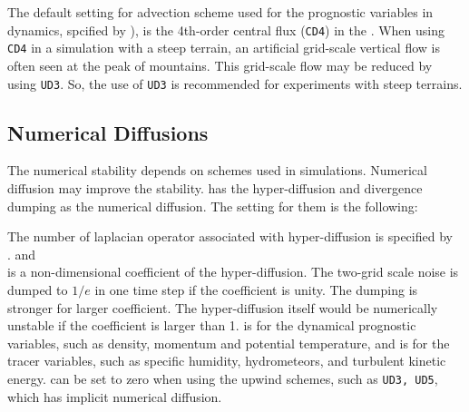 The default setting for advection scheme used for the prognostic variables in dynamics, spcified by ),
is the 4th-order central flux (\verb|CD4|) in the \scalerm.
When using \verb|CD4| in a simulation with a steep terrain,
an artificial grid-scale vertical flow is often seen at the peak of mountains.
This grid-scale flow may be reduced by using \verb|UD3|.
So, the use of \verb|UD3| is recommended for experiments with steep terrains.


\subsection{Numerical Diffusions}

The numerical stability depends on schemes used in simulations.
Numerical diffusion may improve the stability.
\scalerm has the hyper-diffusion and divergence dumping as the numerical diffusion.
The setting for them is the following:


The number of laplacian operator associated with hyper-diffusion is specified by \\
. 
 and \\
 is a non-dimensional coefficient of the hyper-diffusion.
The two-grid scale noise is dumped to $1/e$ in one time step if the coefficient is unity.
The dumping is stronger for larger coefficient.
The hyper-diffusion itself would be numerically unstable if the coefficient is larger than 1.
 is for the dynamical prognostic variables, such as density, momentum and potential temperature, and  is for the tracer variables, such as specific humidity, hydrometeors, and turbulent kinetic energy.
 can be set to zero when using the upwind schemes, such as \verb|UD3, UD5|, which has implicit numerical diffusion.


